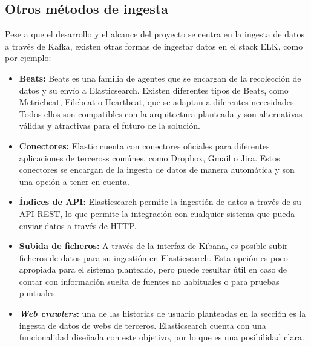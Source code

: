 \newpage{}
\subsection{Otros métodos de ingesta}\label{subsec:impl_ingesta_otros}
Pese a que el desarrollo y el alcance del proyecto se centra en la ingesta de
datos a través de Kafka, existen otras formas de ingestar datos en el stack
ELK, como por ejemplo:

\begin{itemize}
	\item \textbf{Beats:} Beats es una familia de agentes que se encargan de
		la recolección de datos y su envío a Elasticsearch. Existen diferentes
		tipos de Beats, como Metricbeat, Filebeat o Heartbeat, que se adaptan a
		diferentes necesidades. Todos ellos son compatibles con la arquitectura
		planteada y son alternativas válidas y atractivas para el futuro de la
		solución.
	\item \textbf{Conectores:} Elastic cuenta con conectores oficiales para
		diferentes aplicaciones de terceross comúnes, como Dropbox, Gmail o
		Jira. Estos conectores se encargan de la ingesta de datos de manera
		automática y son una opción a tener en cuenta.
	\item \textbf{Índices de API:} Elasticsearch permite la ingestión de datos
		a través de su API REST, lo que permite la integración con cualquier
		sistema que pueda enviar datos a través de HTTP.
	\item \textbf{Subida de ficheros:} A través de la interfaz de Kibana, es
		posible subir ficheros de datos para su ingestión en Elasticsearch. Esta
		opción es poco apropiada para el sistema planteado, pero puede resultar
		útil en caso de contar con información suelta de fuentes no habituales o
		para pruebas puntuales.
	\item \textbf{\textit{Web crawlers}:} una de las historias de usuario
		planteadas en la sección  es la ingesta de
		datos de webs de terceros. Elasticsearch cuenta con una funcionalidad
		diseñada con este objetivo, por lo que es una posibilidad clara.
\end{itemize}
